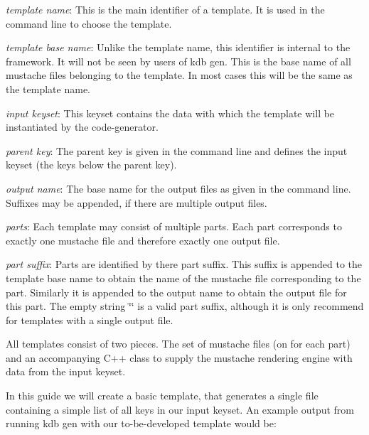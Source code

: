 \begin{DoxyItemize}
\item {\itshape template name}\+: This is the main identifier of a template. It is used in the command line to choose the template.
\item {\itshape template base name}\+: Unlike the template name, this identifier is internal to the framework. It will not be seen by users of {\ttfamily kdb gen}. This is the base name of all mustache files belonging to the template. In most cases this will be the same as the template name.
\item {\itshape input keyset}\+: This keyset contains the data with which the template will be instantiated by the code-\/generator.
\item {\itshape parent key}\+: The parent key is given in the command line and defines the input keyset (the keys below the parent key).
\item {\itshape output name}\+: The base name for the output files as given in the command line. Suffixes may be appended, if there are multiple output files.
\item {\itshape parts}\+: Each template may consist of multiple parts. Each part corresponds to exactly one mustache file and therefore exactly one output file.
\item {\itshape part suffix}\+: Parts are identified by there part suffix. This suffix is appended to the template base name to obtain the name of the mustache file corresponding to the part. Similarly it is appended to the output name to obtain the output file for this part. The empty string {\ttfamily \char`\"{}\char`\"{}} is a valid part suffix, although it is only recommend for templates with a single output file.
\end{DoxyItemize}

All templates consist of two pieces. The set of mustache files (on for each part) and an accompanying C++ class to supply the mustache rendering engine with data from the input keyset.

In this guide we will create a basic template, that generates a single file containing a simple list of all keys in our input keyset. An example output from running {\ttfamily kdb gen} with our to-\/be-\/developed template would be\+:


\begin{DoxyCode}{0}
\end{DoxyCode}


